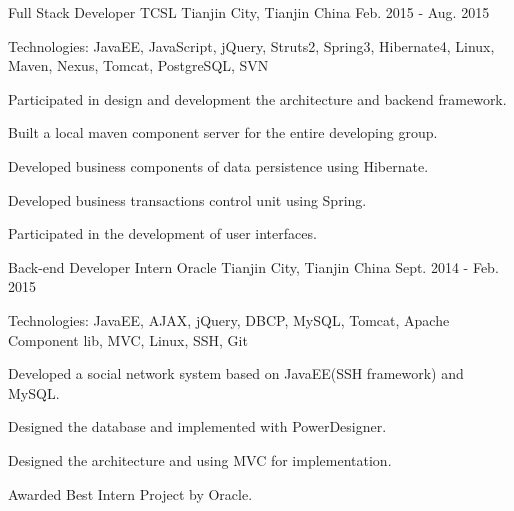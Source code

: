 \begin{cventries}
    
  \cventry
    {Full Stack Developer}
    {TCSL}
    {Tianjin City, Tianjin China}
    {Feb. 2015 - Aug. 2015}
    {
      \begin{cvitems}
        \item {Technologies: JavaEE, JavaScript, jQuery, Struts2, Spring3, Hibernate4, Linux, Maven, Nexus, Tomcat, PostgreSQL, SVN}
        \item {Participated in design and development the architecture and backend framework.}
        \item {Built a local maven component server for the entire developing group.}
        \item {Developed business components of data persistence using Hibernate.}
        \item {Developed business transactions control unit using Spring.}
        \item {Participated in the development of user interfaces.}
      \end{cvitems}
    }
    
  \cventry
    {Back-end Developer Intern}
    {Oracle}
    {Tianjin City, Tianjin China}
    {Sept. 2014 - Feb. 2015}
    {
      \begin{cvitems}
        \item {Technologies: JavaEE, AJAX, jQuery, DBCP, MySQL, Tomcat, Apache Component lib, MVC, Linux, SSH, Git}
        \item {Developed a social network system based on JavaEE(SSH framework) and MySQL.}
        \item {Designed the database and implemented with PowerDesigner.}
        \item {Designed the architecture and using MVC for implementation.}
        \item {Awarded Best Intern Project by Oracle.}
      \end{cvitems} 
    }
\end{cventries}
